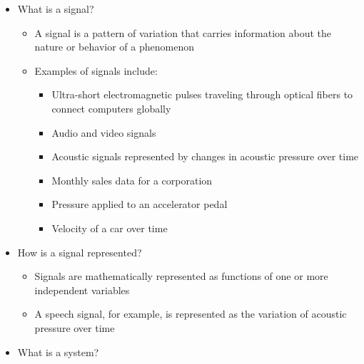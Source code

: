 \begin{itemize}

  \item What is a signal?

    \begin{itemize}

      \item A signal is a pattern of variation that carries information about the nature or behavior of a phenomenon

      \item Examples of signals include:

        \begin{itemize}

          \item Ultra-short electromagnetic pulses traveling through optical fibers to connect computers globally

          \item Audio and video signals

          \item Acoustic signals represented by changes in acoustic pressure over time

          \item Monthly sales data for a corporation

          \item Pressure applied to an accelerator pedal

          \item Velocity of a car over time

        \end{itemize}

    \end{itemize}

  \item How is a signal represented?

    \begin{itemize}

      \item Signals are mathematically represented as functions of one or more independent variables

      \item A speech signal, for example, is represented as the variation of acoustic pressure over time

    \end{itemize}

  \item What is a system?


\end{itemize}
